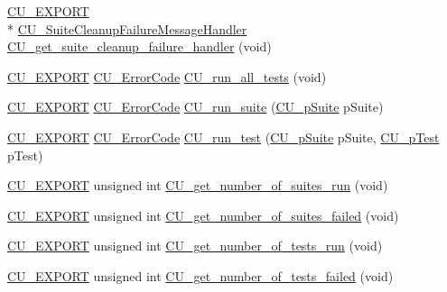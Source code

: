 \begin{DoxyCompactItemize}
\hyperlink{group___framework_ga22e538403fdee24be3388ab473fe64d5}{C\+U\+\_\+\+E\+X\+P\+O\+R\+T} \\*
\hyperlink{group___framework_ga67a720062975e6b7f97df16a1e8e10ce}{C\+U\+\_\+\+Suite\+Cleanup\+Failure\+Message\+Handler} \hyperlink{group___framework_ga9d180e4db3591109077c81c6ab4cb151}{C\+U\+\_\+get\+\_\+suite\+\_\+cleanup\+\_\+failure\+\_\+handler} (void)
\item 
\hyperlink{group___framework_ga22e538403fdee24be3388ab473fe64d5}{C\+U\+\_\+\+E\+X\+P\+O\+R\+T} \hyperlink{group___framework_ga743a2a025ee3eb792d7d85f0eea347e6}{C\+U\+\_\+\+Error\+Code} \hyperlink{group___framework_gada41915e7f9ae386ecc1bed20a79300b}{C\+U\+\_\+run\+\_\+all\+\_\+tests} (void)
\item 
\hyperlink{group___framework_ga22e538403fdee24be3388ab473fe64d5}{C\+U\+\_\+\+E\+X\+P\+O\+R\+T} \hyperlink{group___framework_ga743a2a025ee3eb792d7d85f0eea347e6}{C\+U\+\_\+\+Error\+Code} \hyperlink{group___framework_ga765ad6b90ec25090288ec10d34fc15c0}{C\+U\+\_\+run\+\_\+suite} (\hyperlink{group___framework_gaba832ae8b235f5e70d6a4ac9c3bb1219}{C\+U\+\_\+p\+Suite} p\+Suite)
\item 
\hyperlink{group___framework_ga22e538403fdee24be3388ab473fe64d5}{C\+U\+\_\+\+E\+X\+P\+O\+R\+T} \hyperlink{group___framework_ga743a2a025ee3eb792d7d85f0eea347e6}{C\+U\+\_\+\+Error\+Code} \hyperlink{group___framework_ga4469c032ef93be8169d4869b22ceabd1}{C\+U\+\_\+run\+\_\+test} (\hyperlink{group___framework_gaba832ae8b235f5e70d6a4ac9c3bb1219}{C\+U\+\_\+p\+Suite} p\+Suite, \hyperlink{group___framework_ga249c43fbe4e53452b3f90db1437da04b}{C\+U\+\_\+p\+Test} p\+Test)
\item 
\hyperlink{group___framework_ga22e538403fdee24be3388ab473fe64d5}{C\+U\+\_\+\+E\+X\+P\+O\+R\+T} unsigned int \hyperlink{group___framework_gaab6fa276971a06883668eb2c4f1e99d0}{C\+U\+\_\+get\+\_\+number\+\_\+of\+\_\+suites\+\_\+run} (void)
\item 
\hyperlink{group___framework_ga22e538403fdee24be3388ab473fe64d5}{C\+U\+\_\+\+E\+X\+P\+O\+R\+T} unsigned int \hyperlink{group___framework_ga1bfdd516a754e0f914b0138746b645a4}{C\+U\+\_\+get\+\_\+number\+\_\+of\+\_\+suites\+\_\+failed} (void)
\item 
\hyperlink{group___framework_ga22e538403fdee24be3388ab473fe64d5}{C\+U\+\_\+\+E\+X\+P\+O\+R\+T} unsigned int \hyperlink{group___framework_gac65efb0052e7dce29d1d7ad08cecdbce}{C\+U\+\_\+get\+\_\+number\+\_\+of\+\_\+tests\+\_\+run} (void)
\item 
\hyperlink{group___framework_ga22e538403fdee24be3388ab473fe64d5}{C\+U\+\_\+\+E\+X\+P\+O\+R\+T} unsigned int \hyperlink{group___framework_ga4025c263b716768adf42705a8df34f1c}{C\+U\+\_\+get\+\_\+number\+\_\+of\+\_\+tests\+\_\+failed} (void)

\end{DoxyCompactItemize}

